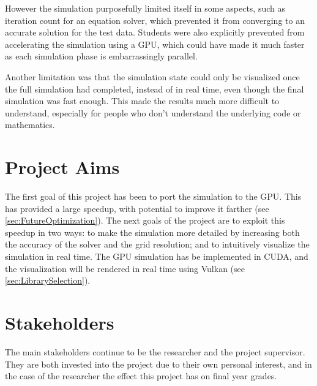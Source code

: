 However the simulation purposefully limited itself in some aspects, such as iteration count for an equation solver, which prevented it from converging to an accurate solution for the test data.
Students were also explicitly prevented from accelerating the simulation using a GPU, which could have made it much faster as each simulation phase is embarrassingly parallel.

Another limitation was that the simulation state could only be visualized once the full simulation had completed,
instead of in real time, even though the final simulation was fast enough.
This made the results much more difficult to understand, especially for people who don't understand the underlying code or mathematics.

\section{Project Aims}
The first goal of this project has been to port the simulation to the GPU.
This has provided a large speedup, with potential to improve it farther (see \cref{sec:FutureOptimization}).
The next goals of the project are to exploit this speedup in two ways: to make the simulation more detailed by increasing both the accuracy of the solver and  the grid resolution; and to intuitively visualize the simulation in real time.
The GPU simulation has be implemented in CUDA, and the visualization will be rendered in real time using Vulkan (see \cref{sec:LibrarySelection}).

\section{Stakeholders}
The main stakeholders continue to be the researcher and the project supervisor.
They are both invested into the project due to their own personal interest, and in the case of the researcher the effect this project has on final year grades.

